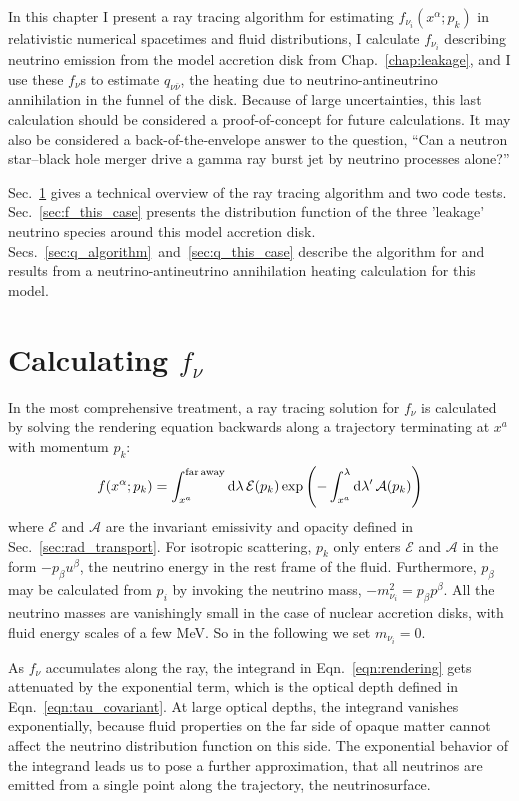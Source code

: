 In this chapter I present a ray tracing algorithm for estimating
$f_{\nu_i}(x^\alpha;p_k)$ in relativistic numerical spacetimes and fluid
distributions, I calculate $f_{\nu_i}$ describing neutrino
emission from the model accretion disk from Chap.~\ref{chap:leakage},
and I use these $f_\nu$s to estimate $q_{\nu\bar{\nu}}$, the heating due to
neutrino-antineutrino annihilation in the funnel of the disk.
Because of large uncertainties,
this last calculation should be considered a proof-of-concept for future
calculations. It may also be considered a back-of-the-envelope answer to
the question, ``Can a neutron star--black hole merger drive a gamma ray burst
jet by neutrino processes alone?''

Sec.~\ref{sec:f_algorithm} gives a technical overview of the ray tracing
algorithm and two code tests. Sec.~\ref{sec:f_this_case} presents the distribution
function of the three 'leakage' neutrino species around this model accretion
disk. Secs.~\ref{sec:q_algorithm}~and~\ref{sec:q_this_case} describe the
algorithm for and results from a neutrino-antineutrino annihilation heating
calculation for this model.

\section{Calculating $f_\nu$}
\label{sec:f_algorithm}

In the most comprehensive treatment, a ray tracing solution for $f_\nu$ is calculated
by solving the rendering equation backwards along a trajectory terminating at
$x^a$ with momentum $p_k$:
\begin{equation}
  \label{eqn:rendering}
  f(x^\alpha;p_k) = \int_{x^a}^{\rm far\,away} \mathrm{d} \lambda \, \mathcal{E}(p_k)
  \exp\left(-\int_{x^a}^\lambda  \mathrm{d} \lambda' \, \mathcal{A}(p_k)\right)
\end{equation}
where $\mathcal{E}$ and $\mathcal{A}$ are the invariant emissivity and opacity
defined in Sec.~\ref{sec:rad_transport}.
For isotropic scattering, $p_k$ only enters $\mathcal{E}$ and $\mathcal{A}$ in the
form $-p_\beta u^\beta$, the neutrino energy in the rest frame of the fluid.
Furthermore, $p_\beta$ may be calculated from $p_i$ by invoking the neutrino mass,
$-m_{\nu_i}^2=p_\beta p^\beta$.
All the neutrino masses are vanishingly small in the case of nuclear
accretion disks, with fluid energy scales of a few MeV. So in the following we
set $m_{\nu_i}=0$.

As $f_\nu$ accumulates along the ray, the integrand in Eqn.~\ref{eqn:rendering}
gets attenuated by the exponential term, which is the optical depth defined in
Eqn.~\ref{eqn:tau_covariant}.
At large optical depths, the integrand vanishes exponentially, because fluid
properties on the far side of opaque matter cannot affect the neutrino
distribution function on this side. The exponential behavior of the integrand
leads us to pose a further approximation, that all neutrinos are emitted from
a single point along the trajectory, the neutrinosurface.

